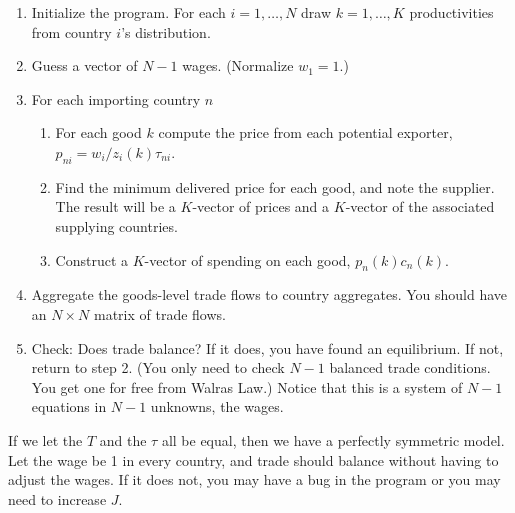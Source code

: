 \documentclass[11pt, pdftex]{article}
\begin{document}
\begin{enumerate}
    \item Initialize the program.  For each $i=1,\ldots,N$ draw $k=1,\ldots,K$ productivities from country $i$'s distribution.
    \item Guess a vector of $N-1$ wages. (Normalize $w_1=1$.)
    \item For each importing country $n$
    \begin{enumerate}
      \item For each good $k$ compute the price from each potential exporter, $p_{ni}=w_i/z_i(k)\tau_{ni}$.
      \item Find the minimum delivered price for each good, and note the supplier. The result will be a $K$-vector of prices and a $K$-vector of the associated supplying countries.
      \item Construct a $K$-vector of spending on each good, $p_n(k)c_n(k)$.
    \end{enumerate}
  \item Aggregate the goods-level trade flows to country aggregates.  You should have an $N\times N$ matrix of trade flows.
  \item Check: Does trade balance? If it does, you have found an equilibrium. If not, return to step 2.  (You only need to check $N-1$ balanced trade conditions.  You get one for free from Walras Law.) Notice that this is a system of $N-1$ equations in $N-1$ unknowns, the wages.
  \end{enumerate}
If we let the $T$ and the $\tau$ all be equal, then we have a perfectly symmetric model.  Let the wage be 1 in every country, and trade should balance without having to adjust the wages.  If it does not, you may have a bug in the program or you may need to increase $J$.
\newpage
{}
\setlength{\parskip}{0.0cm}
\printbibliography
\end{document}
